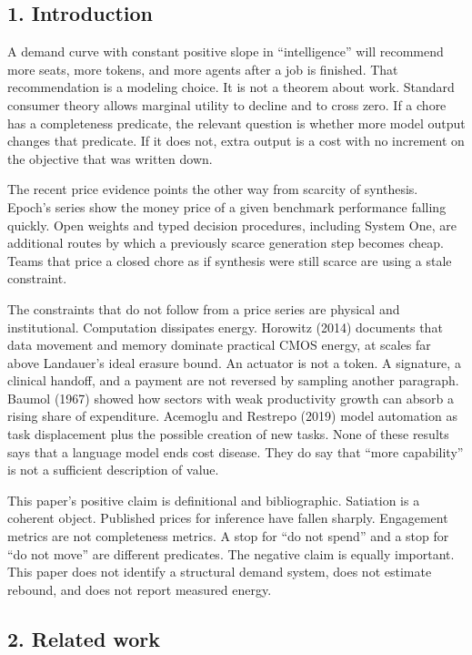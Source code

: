 \documentclass[
  10pt,
]{article}
\begin{document}
\subsection{1. Introduction}\label{introduction}

A demand curve with constant positive slope in ``intelligence'' will
recommend more seats, more tokens, and more agents after a job is
finished. That recommendation is a modeling choice. It is not a theorem
about work. Standard consumer theory allows marginal utility to decline
and to cross zero. If a chore has a completeness predicate, the relevant
question is whether more model output changes that predicate. If it does
not, extra output is a cost with no increment on the objective that was
written down.

The recent price evidence points the other way from scarcity of
synthesis. Epoch's series show the money price of a given benchmark
performance falling quickly. Open weights and typed decision procedures,
including System One, are additional routes by which a previously scarce
generation step becomes cheap. Teams that price a closed chore as if
synthesis were still scarce are using a stale constraint.

The constraints that do not follow from a price series are physical and
institutional. Computation dissipates energy. Horowitz (2014) documents
that data movement and memory dominate practical CMOS energy, at scales
far above Landauer's ideal erasure bound. An actuator is not a token. A
signature, a clinical handoff, and a payment are not reversed by
sampling another paragraph. Baumol (1967) showed how sectors with weak
productivity growth can absorb a rising share of expenditure. Acemoglu
and Restrepo (2019) model automation as task displacement plus the
possible creation of new tasks. None of these results says that a
language model ends cost disease. They do say that ``more capability''
is not a sufficient description of value.

This paper's positive claim is definitional and bibliographic. Satiation
is a coherent object. Published prices for inference have fallen
sharply. Engagement metrics are not completeness metrics. A stop for
``do not spend'' and a stop for ``do not move'' are different
predicates. The negative claim is equally important. This paper does not
identify a structural demand system, does not estimate rebound, and does
not report measured energy.

\subsection{2. Related work}\label{related-work}
\end{document}
